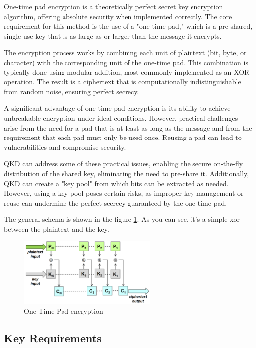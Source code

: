 One-time pad encryption is a theoretically perfect secret key
encryption algorithm, offering absolute security when implemented
correctly. The core requirement for this method is the use of a
"one-time pad," which is a pre-shared, single-use key that is as large
as or larger than the message it encrypts.

The encryption process works by combining each unit of plaintext (bit,
byte, or character) with the corresponding unit of the one-time pad.
This combination is typically done using modular addition, most
commonly implemented as an XOR operation. The result is a ciphertext
that is computationally indistinguishable from random noise, ensuring
perfect secrecy.

A significant advantage of one-time pad encryption is its ability to
achieve unbreakable encryption under ideal conditions. However,
practical challenges arise from the need for a pad that is at least as
long as the message and from the requirement that each pad must only
be used once. Reusing a pad can lead to vulnerabilities and compromise
security.

QKD can address some of these practical issues, enabling the secure
on-the-fly distribution of the shared key, eliminating the need to
pre-share it. Additionally, QKD can create a "key pool" from which
bits can be extracted as needed. However, using a key pool poses
certain risks, as improper key management or reuse can undermine the
perfect secrecy guaranteed by the one-time pad.

The general schema is shown in the figure \ref{fig:otp}. As you can
see, it's a simple xor between the plaintext and the key.

\begin{figure}[H]
  \centering
  \includegraphics[width=0.6\textwidth]{img/otp.png}
  \caption{One-Time Pad encryption}
  \label{fig:otp}
\end{figure}

\subsection{Key Requirements}

